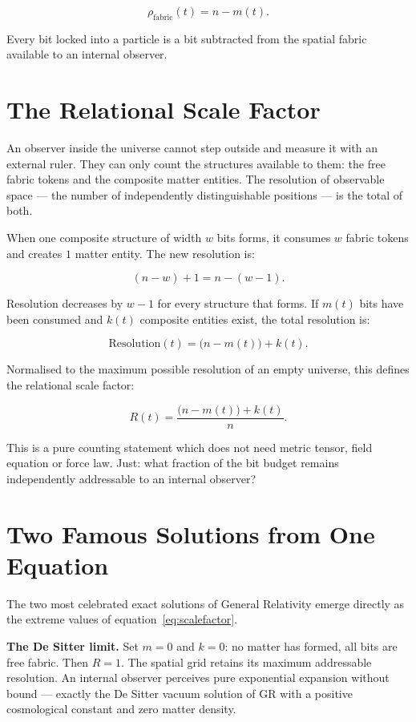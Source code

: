 \[
\rho_{\mathrm{fabric}}(t) = n - m(t).
\]

Every bit locked into a particle is a bit subtracted from the spatial
fabric available to an internal observer.

\section{The Relational Scale Factor}

An observer inside the universe cannot step outside and measure it with
an external ruler. They can only count the structures available to them:
the free fabric tokens and the composite matter entities. The resolution
of observable space --- the number of independently distinguishable
positions --- is the total of both.

When one composite structure of width $w$ bits forms, it consumes $w$
fabric tokens and creates $1$ matter entity. The new resolution is:

\[
(n - w) + 1 = n - (w - 1).
\]

Resolution decreases by $w - 1$ for every structure that forms. If
$m(t)$ bits have been consumed and $k(t)$ composite entities exist, the
total resolution is:

\[
\mathrm{Resolution}(t) = \bigl(n - m(t)\bigr) + k(t).
\]

Normalised to the maximum possible resolution of an empty universe, this
defines the relational scale factor:

\begin{equation}
R(t) = \frac{\bigl(n - m(t)\bigr) + k(t)}{n}.
\label{eq:scalefactor}
\end{equation}

This is a pure counting statement which does not need metric tensor, field equation 
or force law. Just: what fraction of the bit budget remains independently
addressable to an internal observer?

\section{Two Famous Solutions from One Equation}

The two most celebrated exact solutions of General Relativity emerge
directly as the extreme values of equation~\eqref{eq:scalefactor}.

\textbf{The De Sitter limit.} Set $m = 0$ and $k = 0$: no matter has
formed, all bits are free fabric. Then $R = 1$. The spatial grid retains
its maximum addressable resolution. An internal observer perceives pure
exponential expansion without bound --- exactly the De Sitter vacuum
solution of GR with a positive cosmological constant and zero matter
density.

